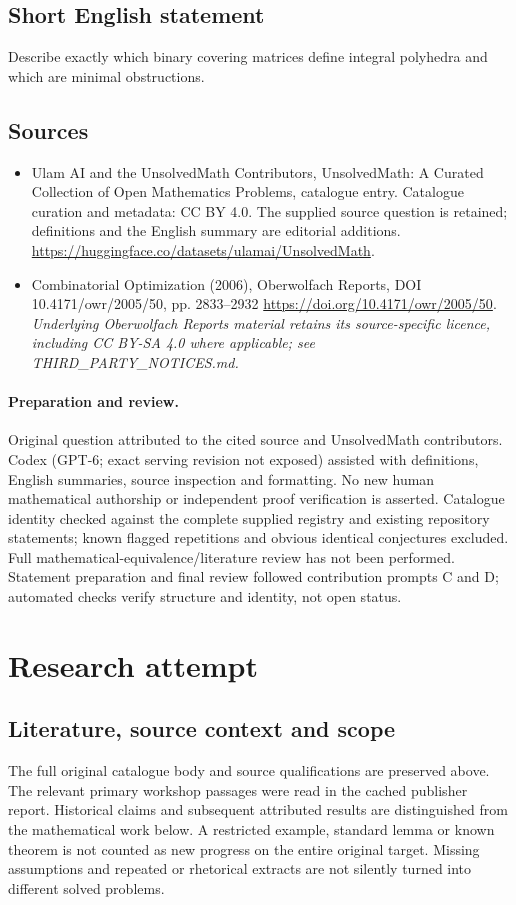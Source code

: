 \documentclass[11pt]{article}
\begin{document}
\subsection{Short English statement}
Describe exactly which binary covering matrices define integral polyhedra and which are minimal obstructions.
\subsection{Sources}
\begin{itemize}
\item[S1] Ulam AI and the UnsolvedMath Contributors, UnsolvedMath: A Curated Collection of Open Mathematics Problems, catalogue entry. Catalogue curation and metadata: CC BY 4.0. The supplied source question is retained; definitions and the English summary are editorial additions.
\url{https://huggingface.co/datasets/ulamai/UnsolvedMath}.
\item[S2] Combinatorial Optimization (2006), Oberwolfach Reports, DOI 10.4171/owr/2005/50, pp. 2833--2932
\url{https://doi.org/10.4171/owr/2005/50}.
\textit{Underlying Oberwolfach Reports material retains its source-specific licence, including CC BY-SA 4.0 where applicable; see THIRD\_PARTY\_NOTICES.md.}
\end{itemize}
\paragraph{Preparation and review.}
Original question attributed to the cited source and UnsolvedMath contributors. Codex (GPT-6; exact serving revision not exposed) assisted with definitions, English summaries, source inspection and formatting. No new human mathematical authorship or independent proof verification is asserted. Catalogue identity checked against the complete supplied registry and existing repository statements; known flagged repetitions and obvious identical conjectures excluded. Full mathematical-equivalence/literature review has not been performed. Statement preparation and final review followed contribution prompts C and D; automated checks verify structure and identity, not open status.
\label{end:statement}

\section{Research attempt}
\subsection{Literature, source context and scope}
The full original catalogue body and source qualifications are preserved above. The relevant primary workshop passages were read in the cached publisher report. Historical claims and subsequent attributed results are distinguished from the mathematical work below. A restricted example, standard lemma or known theorem is not counted as new progress on the entire original target. Missing assumptions and repeated or rhetorical extracts are not silently turned into different solved problems.
\end{document}
